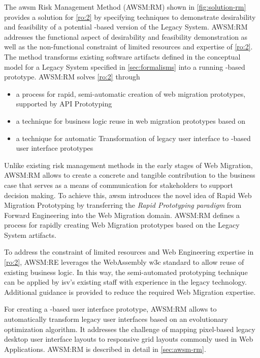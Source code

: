 The \gls{awsm} Risk Management Method (AWSM:RM) shown in \cref{fig:solution-rm} provides a solution for \cref{ro:2} by specifying techniques to demonstrate desirability and feasibility of a potential -based version of the \gls{Legacy System}.
AWSM:RM addresses the functional aspect of desirability and feasibility demonstration as well as the non-functional constraint of limited resources and expertise of \cref{ro:2}.
The method transforms existing software \glspl{artifact} defined in the conceptual model for a \gls{Legacy System} specified in \cref{sec:formalisms} into a running -based prototype.
AWSM:RM solves \cref{ro:2} through
\begin{itemize}
\item a process for rapid, semi-automatic creation of \glspl{web migration prototype}, supported by API Prototyping
\item a technique for business logic reuse in \glspl{web migration prototype} based on 
\item a technique for automatic \gls{Transformation} of legacy user interface to -based user interface prototypes
\end{itemize}

\par\smallskip
Unlike existing \gls{risk management} methods in the early stages of \gls{Web Migration}, AWSM:RM allows to create a concrete and tangible contribution to the \gls{business case} that serves as a means of communication for stakeholders to support decision making.
To achieve this, \gls{awsm} introduces the novel idea of \gls{Rapid Web Migration Prototyping} \autocite{Heil2018ReWaMP} by transferring the \emph{\gls{Rapid Prototyping} paradigm} \autocite{Gordon1995RapidPrototyping} from \gls{Forward Engineering} into the \gls{Web Migration} domain.
AWSM:RM defines a process for rapidly creating \gls{Web Migration} prototypes based on the \gls{Legacy System} \glspl{artifact}.

To address the constraint of limited resources and \gls{Web Engineering} expertise in \cref{ro:2}, AWSM:RE leverages the WebAssembly \gls{w3c} standard \autocite{W3C2018WebAssembly} to allow reuse of existing business logic.
In this way, the semi-automated prototyping technique can be applied by  \gls{isv}'s existing staff with experience in the legacy technology.
Additional guidance is provided to reduce the required \gls{Web Migration} expertise.

For creating a -based user interface prototype, AWSM:RM allows to automatically transform legacy user interfaces based on an evolutionary optimization algorithm.
It addresses the challenge of mapping pixel-based legacy desktop user interface layouts to responsive grid layouts commonly used in \glspl{Web Application}.
AWSM:RM is described in detail in \cref{sec:awsm-rm}.

